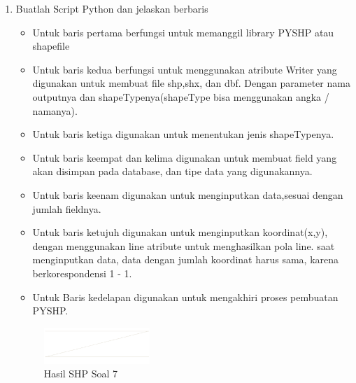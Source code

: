 \begin{enumerate}
	\item Buatlah Script Python dan jelaskan berbaris
	
	\begin{itemize}
		\item Untuk baris pertama berfungsi untuk memanggil library PYSHP atau shapefile
		\item Untuk baris kedua berfungsi untuk menggunakan atribute Writer yang digunakan untuk membuat file shp,shx, dan dbf. \hfill\break Dengan parameter nama outputnya dan shapeTypenya(shapeType bisa menggunakan angka / namanya).
		\item Untuk baris ketiga digunakan untuk menentukan jenis shapeTypenya.
		\item Untuk baris keempat dan kelima digunakan untuk membuat field yang akan disimpan pada database, dan tipe data yang digunakannya.
		\item Untuk baris keenam digunakan untuk menginputkan data,sesuai dengan jumlah fieldnya.
		\item Untuk baris ketujuh digunakan untuk menginputkan koordinat(x,y), dengan menggunakan line atribute untuk menghasilkan pola line. \hfill\break
		saat menginputkan data, data dengan jumlah koordinat harus sama, karena berkorespondensi 1 - 1.
		\item Untuk Baris kedelapan digunakan untuk mengakhiri proses pembuatan PYSHP.
	\end{itemize}
	\hfill\break
	\begin{figure}[H]
		\includegraphics[width=4cm]{figures/1174002/2/7.png}
		\centering
		\caption{Hasil SHP Soal 7}
	\end{figure}


\end{enumerate}

